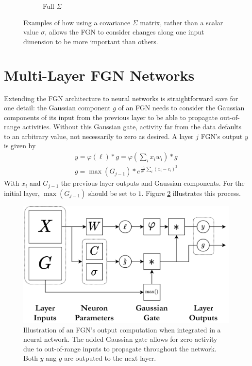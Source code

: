 \documentclass[12pt,oneside]{CUNY_PhD}
\begin{document}
\begin{figure}[!t]
\begin{subfigure}[t]{0.49\textwidth}
        \caption*{Full $\Sigma$}
    \end{subfigure}
    \caption{Examples of how using a covariance $\Sigma$ matrix, rather than a scalar value $\sigma$, allows the FGN to consider changes along one input dimension to be more important than others.}
    \label{fig:covars}
\end{figure}

\section{Multi-Layer FGN Networks}
Extending the FGN architecture to neural networks is straightforward save for one detail: the Gaussian component $g$ of an FGN needs to consider the Gaussian components of its input from the previous layer to be able to propagate out-of-range activities. Without this Gaussian gate, activity far from the data defaults to an arbitrary value, not necessarily to zero as desired. A layer $j$ FGN's output $y$ is given by
\begin{align}
    y =  \varphi(\ell)*g = \varphi(\sum_i x_{i} w_{i}) * g\\
    g = \max(G_{j-1}) * e^{\frac{-1}{\sigma^2}\sum_{i}(x_i-c_i)^2}
\end{align}
With $x_{i}$ and $G_{j-1}$ the previous layer outputs and Gaussian components. For the initial layer, $\max(G_{j-1})$ should be set to $1$. Figure \ref{fig:fgn-layer} illustrates this process.
\begin{figure}[!t]
    \centering
        \includegraphics[width=\textwidth]{images/multi-layer-fgn/FGN-Network.png}
    \caption{Illustration of an FGN's output computation when integrated in a neural network. The added Gaussian gate allows for zero activity due to out-of-range inputs to propagate throughout the network. Both $y$ ang $g$ are outputed to the next layer.}
    \label{fig:fgn-layer}
\end{figure}
\end{document}
